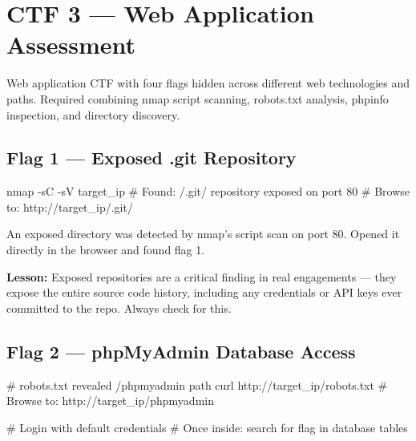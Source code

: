 \chapter{CTF 3 --- Web Application Assessment}
\label{ctf:ctf3}

\begin{notebox}
Web application CTF with four flags hidden across different web technologies
and paths. Required combining nmap script scanning, robots.txt analysis,
phpinfo inspection, and directory discovery.
\end{notebox}

\section*{Flag 1 --- Exposed .git Repository}

\begin{termbox}
nmap -sC -sV target_ip
# Found: /.git/ repository exposed on port 80
# Browse to: http://target_ip/.git/
\end{termbox}

An exposed  directory was detected by nmap's script scan on port 80.
Opened it directly in the browser and found flag 1.

\begin{takebox}
\textbf{Lesson:} Exposed  repositories are a critical finding in real
engagements --- they expose the entire source code history, including any
credentials or API keys ever committed to the repo. Always check for this.
\end{takebox}


\section*{Flag 2 --- phpMyAdmin Database Access}



\begin{termbox}
# robots.txt revealed /phpmyadmin path
curl http://target_ip/robots.txt
# Browse to: http://target_ip/phpmyadmin

# Login with default credentials
# Once inside: search for flag in database tables
\end{termbox}

